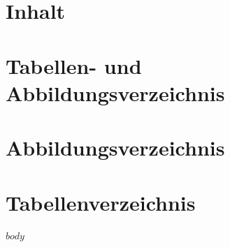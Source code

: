 \documentclass[twoside, pagesize, fontsize=11pt, dvipsnames]{scrreport}
\begin{document}
\clearpage
\section*{Inhalt}
\label{sec:inhalt}

\tableofcontents

\clearpage

\section*{Tabellen- und Abbildungsverzeichnis}


\section*{Abbildungsverzeichnis}
\label{sec:Abbildungsverzeichnis}

\listoffigures

\section*{Tabellenverzeichnis}
\label{sec:tabellenverzeichnis}

\listoftables

\cleardoublepage




$body$



\end{document}
